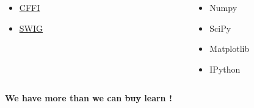 \begin{frame}
\begin{columns}[t]
\begin{column}{.3\textwidth}
\begin{itemize}
      \item \href{http://cffi.readthedocs.io/en/latest}{CFFI}
      \item \href{http://www.swig.org}{SWIG}
      \end{itemize}
    \end{column}
    \begin{column}{.05\textwidth}
    \end{column}
    \begin{column}{.3\textwidth}
      \begin{itemize}
      \item Numpy
      \item SciPy
      \item Matplotlib
      \item IPython
      \end{itemize}
    \end{column}
    \normalsize
  \end{columns}
  \vspace{1em}
  \centerline{\textbf{We have more than we can \st{buy} learn !}} %
\end{frame}

